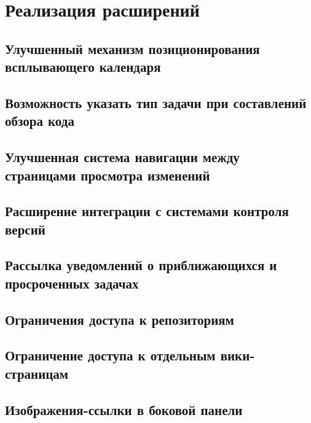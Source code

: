 \chapter{Реализация расширений}


\section{Улучшенный механизм позиционирования всплывающего календаря}

\section{Возможность указать тип задачи при составлений обзора кода}

\section{Улучшенная система навигации между страницами просмотра изменений}

\section{Расширение интеграции с системами контроля версий}

\section{Рассылка уведомлений о приближающихся и просроченных задачах}

\section{Ограничения доступа к репозиториям}

\section{Ограничение доступа к отдельным вики-страницам}

\section{Изображения-ссылки в боковой панели}



